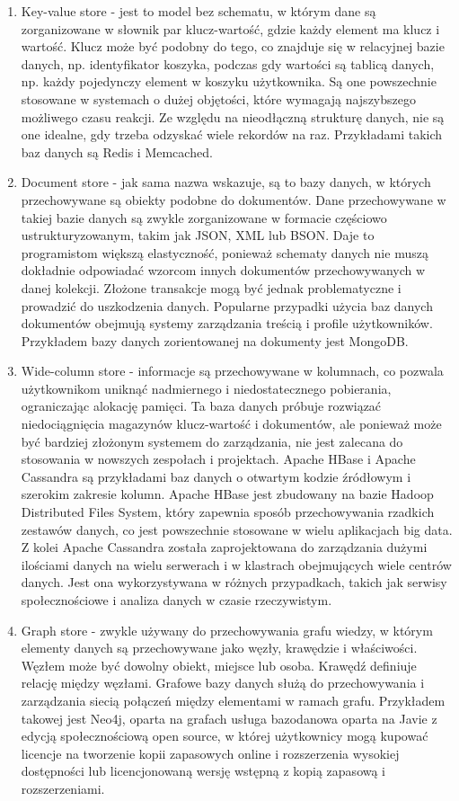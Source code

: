 \documentclass[12pt, a4paper, twoside, openany]{book}
\begin{document}
\begin{enumerate}[label=--]
    \item Key-value store - jest to model bez schematu, w którym dane są zorganizowane w słownik par klucz-wartość, gdzie każdy element ma klucz i wartość. Klucz może być podobny do tego, co znajduje się w relacyjnej bazie danych, np. identyfikator koszyka, podczas gdy wartości są tablicą danych, np. każdy pojedynczy element w koszyku użytkownika. Są one powszechnie stosowane w systemach o dużej objętości, które wymagają najszybszego możliwego czasu reakcji. Ze względu na nieodłączną strukturę danych, nie są one idealne, gdy trzeba odzyskać wiele rekordów na raz. Przykładami takich baz danych są Redis i Memcached.
    \item Document store - jak sama nazwa wskazuje, są to bazy danych, w których przechowywane są obiekty podobne do dokumentów. Dane przechowywane w takiej bazie danych są zwykle zorganizowane w formacie częściowo ustrukturyzowanym, takim jak JSON, XML lub BSON. Daje to programistom większą elastyczność, ponieważ schematy danych nie muszą dokładnie odpowiadać wzorcom innych dokumentów przechowywanych w danej kolekcji. Złożone transakcje mogą być jednak problematyczne i prowadzić do uszkodzenia danych. Popularne przypadki użycia baz danych dokumentów obejmują systemy zarządzania treścią i profile użytkowników. Przykładem bazy danych zorientowanej na dokumenty jest MongoDB.
    \item Wide-column store - informacje są przechowywane w kolumnach, co pozwala użytkownikom uniknąć nadmiernego i niedostatecznego pobierania, ograniczając alokację pamięci. Ta baza danych próbuje rozwiązać niedociągnięcia magazynów klucz-wartość i dokumentów, ale ponieważ może być bardziej złożonym systemem do zarządzania, nie jest zalecana do stosowania w nowszych zespołach i projektach. Apache HBase i Apache Cassandra są przykładami baz danych o otwartym kodzie źródłowym i szerokim zakresie kolumn. Apache HBase jest zbudowany na bazie Hadoop Distributed Files System, który zapewnia sposób przechowywania rzadkich zestawów danych, co jest powszechnie stosowane w wielu aplikacjach big data. Z kolei Apache Cassandra została zaprojektowana do zarządzania dużymi ilościami danych na wielu serwerach i w klastrach obejmujących wiele centrów danych. Jest ona wykorzystywana w różnych przypadkach, takich jak serwisy społecznościowe i analiza danych w czasie rzeczywistym.
    \item Graph store - zwykle używany do przechowywania grafu wiedzy, w którym elementy danych są przechowywane jako węzły, krawędzie i właściwości. Węzłem może być dowolny obiekt, miejsce lub osoba. Krawędź definiuje relację między węzłami. Grafowe bazy danych służą do przechowywania i zarządzania siecią połączeń między elementami w ramach grafu. Przykładem takowej jest Neo4j, oparta na grafach usługa bazodanowa oparta na Javie z edycją społecznościową open source, w której użytkownicy mogą kupować licencje na tworzenie kopii zapasowych online i rozszerzenia wysokiej dostępności lub licencjonowaną wersję wstępną z kopią zapasową i rozszerzeniami.
\end{enumerate}
\end{document}
